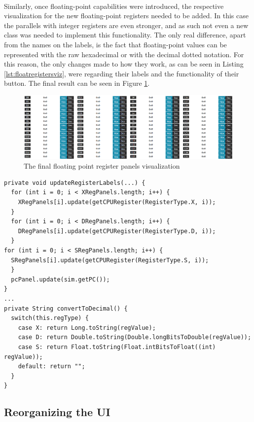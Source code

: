 \paragraph{}
Similarly, once floating-point capabilities were introduced, the respective visualization for the new floating-point registers needed to be added. In this case the parallels with integer registers are even stronger, and as such not even a new class was needed to implement this functionality. The only real difference, apart from the names on the labels, is the fact that floating-point values can be represented with the raw hexadecimal or with the decimal dotted notation. For this reason, the only changes made to how they work, as can be seen in Listing \ref{lst:floatregistersviz}, were regarding their labels and the functionality of their button. The final result can be seen in Figure \ref{fig:floatregsvis}.
\begin{figure}[H]
    \centering
    \includegraphics[width=1\linewidth]{img/float_regs_vis.png}
    \caption{The final floating point register panels visualization}
    \label{fig:floatregsvis}
\end{figure}
\begin{lstlisting}[float, caption={Logic of the floating-point registers' visualization}, label={lst:floatregistersviz}]
private void updateRegisterLabels(...) {
  for (int i = 0; i < XRegPanels.length; i++) {
    XRegPanels[i].update(getCPURegister(RegisterType.X, i));
  }
  for (int i = 0; i < DRegPanels.length; i++) {
    DRegPanels[i].update(getCPURegister(RegisterType.D, i));
  }
for (int i = 0; i < SRegPanels.length; i++) {
  SRegPanels[i].update(getCPURegister(RegisterType.S, i));
  }
  pcPanel.update(sim.getPC());
}
...
private String convertToDecimal() {
  switch(this.regType) {
    case X: return Long.toString(regValue);
    case D: return Double.toString(Double.longBitsToDouble(regValue));
    case S: return Float.toString(Float.intBitsToFloat((int) regValue));
    default: return "";
  }
}
\end{lstlisting}
\subsection{Reorganizing the UI}
